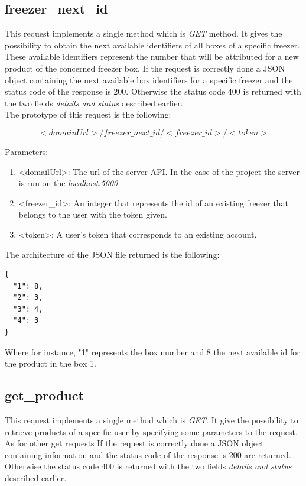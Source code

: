 \subsection{freezer\_next\_id}
This request implements a single method which is \textit{GET} method. It gives the possibility to obtain the next available identifiers of all boxes of a specific freezer. These available identifiers represent the number that will be attributed for a new product of the concerned freezer box. If the request is correctly done a JSON object containing the next available box identifiers for a specific freezer and the status code of the response is 200. Otherwise the status code 400 is returned with the two fields \textit{details and status} described earlier.\\

The prototype of this request is the following:

$$<domainUrl>/freezer\_next\_id/<freezer\_id>/<token>$$

Parameters:
\begin{enumerate}
\item <domailUrl>: The url of the server API. In the case of the project the server is run on the \textit{localhost:5000}
\item <freezer\_id>: An integer that represents the id of an existing freezer that belongs to the user with the token given.
\item <token>: A user's token that corresponds to an existing account.
\end{enumerate}

The architecture of the JSON file returned is the following:
\begin{lstlisting}
{
  "1": 8, 
  "2": 3, 
  "3": 4, 
  "4": 3
}
\end{lstlisting}
Where for instance, "1" represents the box number and 8 the next available id for the product in the box 1.

\subsection{get\_product}
This request implements a single method which is \textit{GET}. It give the possibility to retrieve products of a specific user by specifying some parameters to the request. As for other get requests If the request is correctly done a JSON object containing information and the status code of the response is 200 are returned. Otherwise the status code 400 is returned with the two fields \textit{details and status} described earlier.\\

